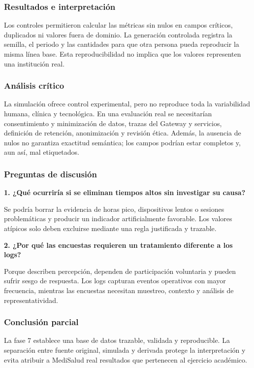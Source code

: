 \subsubsection{Resultados e interpretación}

Los controles permitieron calcular las métricas sin nulos en campos críticos, duplicados ni valores fuera de dominio. La generación controlada registra la semilla, el periodo y las cantidades para que otra persona pueda reproducir la misma línea base. Esta reproducibilidad no implica que los valores representen una institución real.

\subsubsection{Análisis crítico}

La simulación ofrece control experimental, pero no reproduce toda la variabilidad humana, clínica y tecnológica. En una evaluación real se necesitarían consentimiento y minimización de datos, trazas del Gateway y servicios, definición de retención, anonimización y revisión ética. Además, la ausencia de nulos no garantiza exactitud semántica; los campos podrían estar completos y, aun así, mal etiquetados.

\subsubsection{Preguntas de discusión}

\textbf{1. ¿Qué ocurriría si se eliminan tiempos altos sin investigar su causa?}

Se podría borrar la evidencia de horas pico, dispositivos lentos o sesiones problemáticas y producir un indicador artificialmente favorable. Los valores atípicos solo deben excluirse mediante una regla justificada y trazable.

\textbf{2. ¿Por qué las encuestas requieren un tratamiento diferente a los logs?}

Porque describen percepción, dependen de participación voluntaria y pueden sufrir sesgo de respuesta. Los logs capturan eventos operativos con mayor frecuencia, mientras las encuestas necesitan muestreo, contexto y análisis de representatividad.

\subsubsection{Conclusión parcial}

La fase 7 establece una base de datos trazable, validada y reproducible. La separación entre fuente original, simulada y derivada protege la interpretación y evita atribuir a MediSalud real resultados que pertenecen al ejercicio académico.

